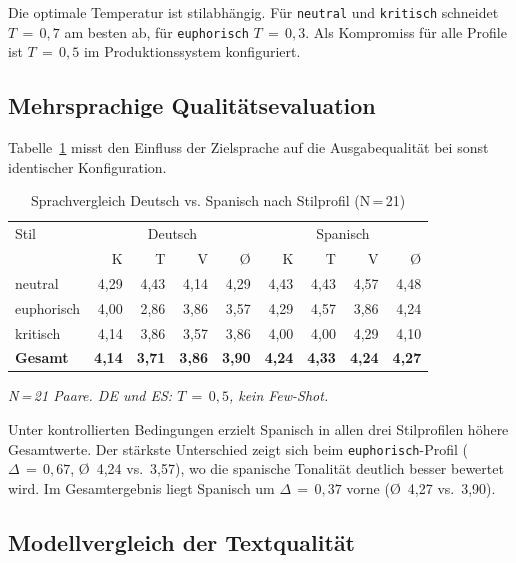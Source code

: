 Die optimale Temperatur ist stilabhängig. Für \texttt{neutral} und \texttt{kritisch} schneidet $T\,=\,0{,}7$ am besten ab, für \texttt{euphorisch} $T\,=\,0{,}3$. Als Kompromiss für alle Profile ist $T\,=\,0{,}5$ im Produktionssystem konfiguriert.

\subsection{Mehrsprachige Qualitätsevaluation}\label{mehrsprachige-verifikation}

Tabelle~\ref{tab:sprachvergleich} misst den Einfluss der Zielsprache auf die Ausgabequalität bei sonst identischer Konfiguration.

\begin{longtable}[]{@{}lrrrrrrrr@{}}
\caption{Sprachvergleich Deutsch vs. Spanisch nach Stilprofil (N\,=\,21)}\label{tab:sprachvergleich}\\
\toprule\noalign{}
Stil & \multicolumn{4}{c}{Deutsch} & \multicolumn{4}{c}{Spanisch} \\
     & K & T & V & Ø & K & T & V & Ø \\
\midrule\noalign{}
\endhead
\bottomrule\noalign{}
\endlastfoot
neutral    & 4{,}29 & 4{,}43 & 4{,}14 & 4{,}29 & 4{,}43 & 4{,}43 & 4{,}57 & 4{,}48 \\
euphorisch & 4{,}00 & 2{,}86 & 3{,}86 & 3{,}57 & 4{,}29 & 4{,}57 & 3{,}86 & 4{,}24 \\
kritisch   & 4{,}14 & 3{,}86 & 3{,}57 & 3{,}86 & 4{,}00 & 4{,}00 & 4{,}29 & 4{,}10 \\
\textbf{Gesamt} & \textbf{4{,}14} & \textbf{3{,}71} & \textbf{3{,}86} & \textbf{3{,}90} & \textbf{4{,}24} & \textbf{4{,}33} & \textbf{4{,}24} & \textbf{4{,}27} \\
\end{longtable}

\emph{N\,=\,21 Paare. DE und ES: $T\,=\,0{,}5$, kein Few-Shot.}

Unter kontrollierten Bedingungen erzielt Spanisch in allen drei Stilprofilen höhere Gesamtwerte. Der stärkste Unterschied zeigt sich beim \texttt{euphorisch}-Profil ($\Delta\,=\,0{,}67$, Ø~4{,}24 vs.\ 3{,}57), wo die spanische Tonalität deutlich besser bewertet wird. Im Gesamtergebnis liegt Spanisch um $\Delta\,=\,0{,}37$ vorne (Ø~4{,}27 vs.\ 3{,}90).

\subsection{Modellvergleich der Textqualität}\label{modellvergleich-qualitaet}

